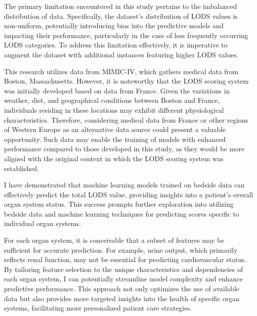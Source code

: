 \documentclass[12pt,a4paper,english
]{tunithesis}
\begin{document}
The primary limitation encountered in this study pertains to the imbalanced distribution of data. Specifically, the dataset's distribution of LODS values is non-uniform, potentially introducing bias into the predictive models and impacting their performance, particularly in the case of less frequently occurring LODS categories. To address this limitation effectively, it is imperative to augment the dataset with additional instances featuring higher LODS values. 


This research utilizes data from MIMIC-IV, which gathers medical data from Boston, Massachusetts. However, it is noteworthy that the LODS scoring system was initially developed based on data from France. Given the variations in weather, diet, and geographical conditions between Boston and France, individuals residing in these locations may exhibit different physiological characteristics. Therefore, considering medical data from France or other regions of Western Europe as an alternative data source could present a valuable opportunity. Such data may enable the training of models with enhanced performance compared to those developed in this study, as they would be more aligned with the original context in which the LODS scoring system was established. 

I have demonstrated that machine learning models trained on bedside data can effectively predict the total LODS value, providing insights into a patient's overall organ system status. This success prompts further exploration into utilizing bedside data and machine learning techniques for predicting scores specific to individual organ systems.

For each organ system, it is conceivable that a subset of features may be sufficient for accurate prediction. For example, urine output, which primarily reflects renal function, may not be essential for predicting cardiovascular status. By tailoring feature selection to the unique characteristics and dependencies of each organ system, I can potentially streamline model complexity and enhance predictive performance. This approach not only optimizes the use of available data but also provides more targeted insights into the health of specific organ systems, facilitating more personalized patient care strategies.
\end{document}
